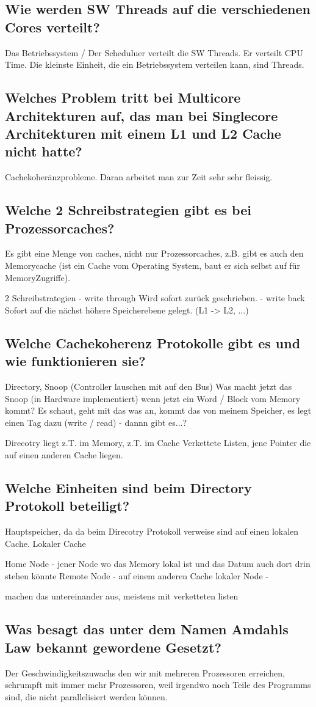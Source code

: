 \subsection{Wie werden SW Threads auf die verschiedenen Cores verteilt?}
Das Betriebssystem / Der Scheduluer verteilt die SW Threads. Er verteilt CPU Time. Die kleinste Einheit, die ein Betriebssystem verteilen kann, sind Threads.
\subsection{Welches Problem tritt bei Multicore Architekturen auf, das man bei Singlecore Architekturen mit einem L1 und L2 Cache nicht hatte?}
Cachekoheränzprobleme. Daran arbeitet man zur Zeit sehr sehr fleissig.
\subsection{Welche 2 Schreibstrategien gibt es bei Prozessorcaches?}
Es gibt eine Menge von caches, nicht nur Prozessorcaches, z.B. gibt es auch den Memorycache (ist ein Cache vom Operating System, baut er sich selbst auf für MemoryZugriffe).

2 Schreibstrategien
- write through
	Wird sofort zurück geschrieben.
- write back
	Sofort auf die nächst höhere Speicherebene gelegt. (L1 -> L2, ...)
\subsection{Welche Cachekoherenz Protokolle gibt es und wie funktionieren sie?}
Directory, Snoop (Controller lauschen mit auf den Bus)
Was macht jetzt das Snoop (in Hardware implementiert) wenn jetzt ein Word / Block vom Memory kommt?
Es schaut, geht mit das was an, kommt das von meinem Speicher, es legt einen Tag dazu (write / read) - dannn gibt es...?

Direcotry liegt z.T. im Memory, z.T. im Cache
Verkettete Listen, jene Pointer die auf einen anderen Cache liegen.

\subsection{Welche Einheiten sind beim Directory Protokoll beteiligt?}
Hauptspeicher, da da beim Direcotry Protokoll verweise sind auf einen lokalen Cache.
Lokaler Cache

Home Node - jener Node wo das Memory lokal ist und das Datum auch dort drin stehen könnte
Remote Node - auf einem anderen Cache
lokaler Node - 

machen das untereinander aus, meistens mit verketteten listen
\subsection{Was besagt das unter dem Namen Amdahls Law bekannt gewordene Gesetzt?}
Der Geschwindigkeitszuwachs den wir mit mehreren Prozessoren erreichen, schrumpft mit immer mehr Prozessoren, weil irgendwo noch Teile des Programms sind, die nicht parallelisiert werden können.
